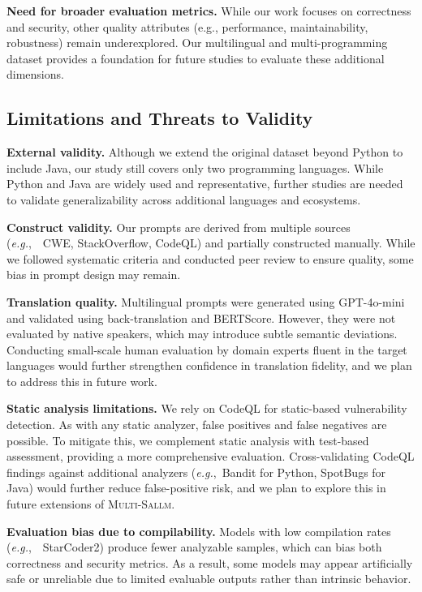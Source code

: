 \documentclass[pdflatex,sn-mathphys-ay]{sn-jnl}
\newcommand{\eg}{\textit{e.g.},\ }
\newcommand{\sandoval}[0]{\textsc{Multi-Sallm}}
\begin{document}
\textbf{Need for broader evaluation metrics.}
While our work focuses on correctness and security, other quality attributes (e.g., performance, maintainability, robustness) remain underexplored. Our multilingual and multi-programming dataset provides a foundation for future studies to evaluate these additional dimensions.

\subsection{Limitations and Threats to Validity}
\label{subsec:Limitations}

\textbf{External validity.}
Although we extend the original dataset beyond Python to include Java, our study still covers only two programming languages. While Python and Java are widely used and representative, further studies are needed to validate generalizability across additional languages and ecosystems.

\textbf{Construct validity.}
Our prompts are derived from multiple sources (\eg~CWE, StackOverflow, CodeQL) and partially constructed manually. While we followed systematic criteria and conducted peer review to ensure quality, some bias in prompt design may remain.

\textbf{Translation quality.}
Multilingual prompts were generated using GPT-4o-mini and validated using back-translation and BERTScore. However, they were not evaluated by native speakers, which may introduce subtle semantic deviations. Conducting small-scale human evaluation by domain experts fluent in the target languages would further strengthen confidence in translation fidelity, and we plan to address this in future work.

\textbf{Static analysis limitations.}
We rely on CodeQL for static-based vulnerability detection. As with any static analyzer, false positives and false negatives are possible. To mitigate this, we complement static analysis with test-based assessment, providing a more comprehensive evaluation. Cross-validating CodeQL findings against additional analyzers (\eg Bandit for Python, SpotBugs for Java) would further reduce false-positive risk, and we plan to explore this in future extensions of \sandoval.

\textbf{Evaluation bias due to compilability.}
Models with low compilation rates (\eg~StarCoder2) produce fewer analyzable samples, which can bias both correctness and security metrics. As a result, some models may appear artificially safe or unreliable due to limited evaluable outputs rather than intrinsic behavior.
\end{document}
